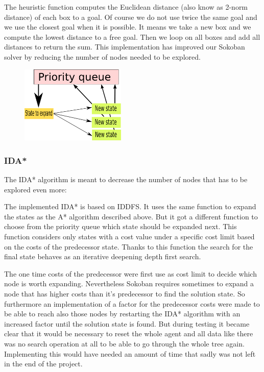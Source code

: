 \documentclass[a4paper,10pt]{article}
\begin{document}
	The heuristic function computes the Euclidean distance (also know as 2-norm distance) of each  box to a goal. 
	Of course we do not use twice the same goal and we use the closest goal when it is possible. It means we take a new box and we compute the lowest distance to a free goal. Then we loop on all boxes and add all distances to return the sum. 
	This implementation has improved our Sokoban solver by reducing the number of nodes needed to be explored.

	\begin{figure}[h]
	\centerline{\includegraphics[height=5 cm, width=5cm]{./priority_state.png}}
	\end{figure}

	\subsubsection{IDA*}
	The IDA* algorithm is meant to decrease the number of nodes that has to be explored even more:

	The implemented IDA* is based on IDDFS. It uses the same function to expand the states as the A* algorithm described above. 
	But it got a different function to choose from the priority queue which state should be expanded next. 
	This function considers only states with a cost value under a specific cost limit based on the costs of the predecessor state. 
	Thanks to this function the search for the final state behaves as an iterative deepening depth first search.

	The one time costs of the predecessor were first use as cost limit to decide which node is worth expanding. Nevertheless Sokoban requires sometimes to expand a node that has higher costs than it's predecessor to find the solution state. 
	So furthermore an implementation of a factor for the predecessor costs were made to be able to reach also those nodes by restarting the IDA* algorithm with an increased factor until the solution state is found. But during testing it became clear that it would be necessary to reset the whole agent and all data like there was no search operation at all to be able to go through the whole tree again. Implementing this would have needed an amount of time that sadly was not left in the end of the project.
\end{document}
